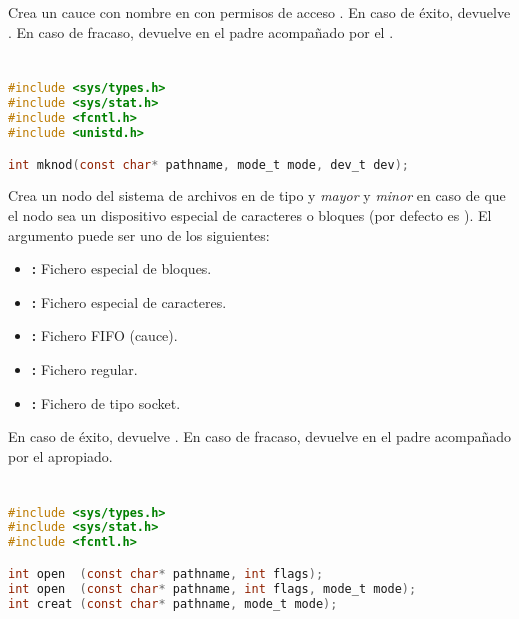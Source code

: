 Crea un cauce con nombre en  con permisos de acceso .
En caso de éxito, devuelve .
En caso de fracaso, devuelve  en el padre acompañado por el .

\section{}\label{mknod}

\begin{lstlisting}[language=C]
#include <sys/types.h>
#include <sys/stat.h>
#include <fcntl.h>
#include <unistd.h>

int mknod(const char* pathname, mode_t mode, dev_t dev);
\end{lstlisting}

Crea un nodo del sistema de archivos en  de tipo  y \emph{mayor} y \emph{minor}  en caso de que el nodo sea un dispositivo especial de caracteres o bloques (por defecto es ).
El argumento  puede ser uno de los siguientes:

\begin{itemize}
	\item{}\textbf{:} Fichero especial de bloques.
	\item{}\textbf{:} Fichero especial de caracteres.
	\item{}\textbf{:} Fichero FIFO (cauce).
	\item{}\textbf{:} Fichero regular.
	\item{}\textbf{:} Fichero de tipo socket.
\end{itemize}

En caso de éxito, devuelve .
En caso de fracaso, devuelve  en el padre acompañado por el  apropiado.

\section{}\label{open}

\begin{lstlisting}[language=C]
#include <sys/types.h>
#include <sys/stat.h>
#include <fcntl.h>

int open  (const char* pathname, int flags);
int open  (const char* pathname, int flags, mode_t mode);
int creat (const char* pathname, mode_t mode);
\end{lstlisting}


